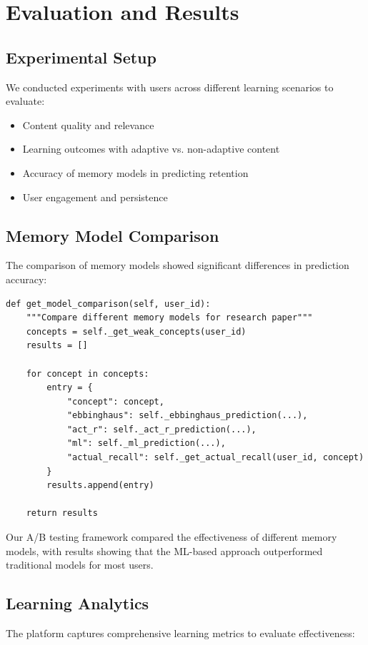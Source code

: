 \documentclass[conference]{IEEEtran}
\begin{document}
\section{Evaluation and Results}
\subsection{Experimental Setup}
We conducted experiments with users across different learning scenarios to evaluate:

\begin{itemize}
    \item Content quality and relevance
    \item Learning outcomes with adaptive vs. non-adaptive content
    \item Accuracy of memory models in predicting retention
    \item User engagement and persistence
\end{itemize}

\subsection{Memory Model Comparison}
The comparison of memory models showed significant differences in prediction accuracy:

\begin{verbatim}
def get_model_comparison(self, user_id):
    """Compare different memory models for research paper"""
    concepts = self._get_weak_concepts(user_id)
    results = []
    
    for concept in concepts:
        entry = {
            "concept": concept,
            "ebbinghaus": self._ebbinghaus_prediction(...),
            "act_r": self._act_r_prediction(...),
            "ml": self._ml_prediction(...),
            "actual_recall": self._get_actual_recall(user_id, concept)
        }
        results.append(entry)
    
    return results
\end{verbatim}

Our A/B testing framework compared the effectiveness of different memory models, with results showing that the ML-based approach outperformed traditional models for most users.

\subsection{Learning Analytics}
The platform captures comprehensive learning metrics to evaluate effectiveness:
\end{document}
